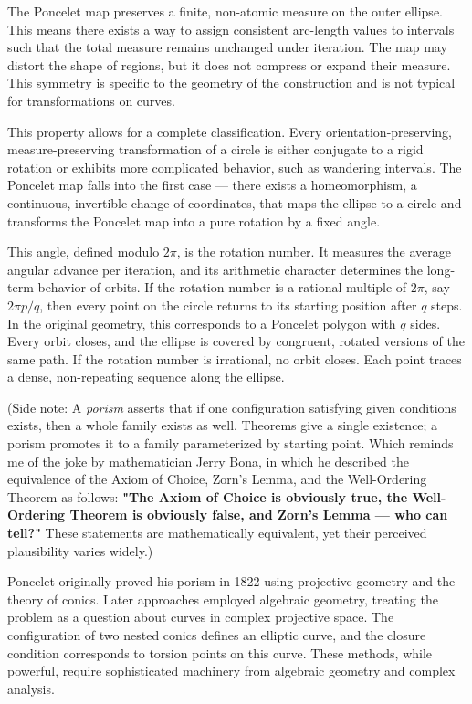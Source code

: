 The Poncelet map preserves a finite, non-atomic measure on the outer ellipse. This means there exists a way to assign consistent arc-length values to intervals such that the total measure remains unchanged under iteration. The map may distort the shape of regions, but it does not compress or expand their measure. This symmetry is specific to the geometry of the construction and is not typical for transformations on curves.

This property allows for a complete classification. Every orientation-preserving, measure-preserving transformation of a circle is either conjugate to a rigid rotation or exhibits more complicated behavior, such as wandering intervals. The Poncelet map falls into the first case — there exists a homeomorphism, a continuous, invertible change of coordinates, that maps the ellipse to a circle and transforms the Poncelet map into a pure rotation by a fixed angle.

This angle, defined modulo $2\pi$, is the rotation number. It measures the average angular advance per iteration, and its arithmetic character determines the long-term behavior of orbits. If the rotation number is a rational multiple of $2\pi$, say $2\pi p/q$, then every point on the circle returns to its starting position after $q$ steps. In the original geometry, this corresponds to a Poncelet polygon with $q$ sides. Every orbit closes, and the ellipse is covered by congruent, rotated versions of the same path. If the rotation number is irrational, no orbit closes. Each point traces a dense, non-repeating sequence along the ellipse.

(Side note: A \emph{porism} asserts that if one configuration satisfying given conditions exists, then a whole family exists as well. Theorems give a single existence; a porism promotes it to a family parameterized by starting point. Which reminds me of the joke by mathematician Jerry Bona, in which he described the equivalence of the Axiom of Choice, Zorn’s Lemma, and the Well-Ordering Theorem as follows: \textbf{"The Axiom of Choice is obviously true, the Well-Ordering Theorem is obviously false, and Zorn’s Lemma — who can tell?"} These statements are mathematically equivalent, yet their perceived plausibility varies widely.)

Poncelet originally proved his porism in 1822 using projective geometry and the theory of conics. Later approaches employed algebraic geometry, treating the problem as a question about curves in complex projective space. The configuration of two nested conics defines an elliptic curve, and the closure condition corresponds to torsion points on this curve. These methods, while powerful, require sophisticated machinery from algebraic geometry and complex analysis.

